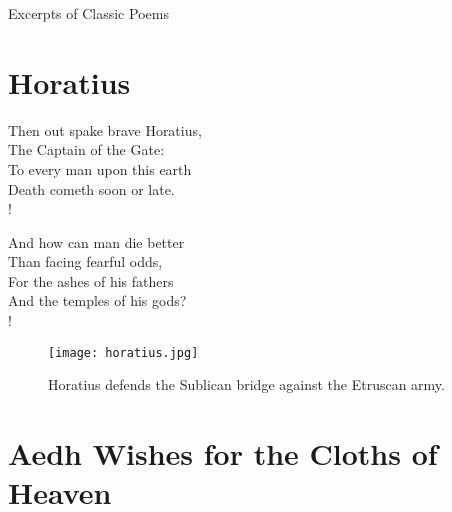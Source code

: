 




\begin{center}
	\Huge{\calligra Excerpts of Classic Poems}
\end{center}




\section{Horatius~\cite{maculay-lays}}
\label{sec:horatius}


\begin{doublepoem}
	\begin{altverse}\xstanza
	Then out spake brave Horatius,	\\
	The Captain of the Gate:		\\
	To every man upon this earth	\\
	Death cometh soon or late.		\\!
	\end{altverse}

	\begin{altverse}\xstanza
	And how can man die better		\\
	Than facing fearful odds,		\\
	For the ashes of his fathers	\\
	And the temples of his gods?	\\!
	\end{altverse}
\end{doublepoem}


\begin{figure}[h]
	\centering
	\texttt{[image: horatius.jpg]}
	\caption{Horatius defends the Sublican bridge against the Etruscan army.}
\end{figure}


\section{Aedh Wishes for the Cloths of Heaven~\cite{yeats-aedh}}
\label{sec:aedh}


